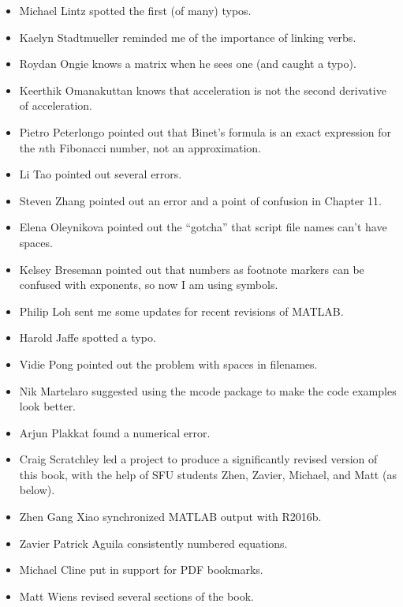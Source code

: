 \documentclass[
]{book}
\begin{document}
\begin{itemize}

\item Michael Lintz spotted the first (of many) typos.

\item Kaelyn Stadtmueller reminded me of the importance of linking
verbs.

\item Roydan Ongie knows a matrix when he sees one (and caught a typo).

\item Keerthik Omanakuttan knows that acceleration is not the
second derivative of acceleration.

\item Pietro Peterlongo pointed out that Binet's formula is an
exact expression for the $n$th Fibonacci number, not an approximation.

\item Li Tao pointed out several errors.

\item Steven Zhang pointed out an error and a point of confusion
in Chapter 11.

\item Elena Oleynikova pointed out the ``gotcha'' that script file names
can't have spaces.

\item Kelsey Breseman pointed out that numbers as footnote markers
can be confused with exponents, so now I am using symbols.

\item Philip Loh sent me some updates for recent revisions of MATLAB.

\item Harold Jaffe spotted a typo.

\item Vidie Pong pointed out the problem with spaces in filenames.

\item Nik Martelaro suggested using the mcode package to make the
code examples look better.

\item Arjun Plakkat found a numerical error.

\item Craig Scratchley led a project to produce a significantly
revised version of this book, with the help of SFU students Zhen, Zavier,
Michael, and Matt (as below).

\item Zhen Gang Xiao synchronized MATLAB output with R2016b.

\item Zavier Patrick Aguila consistently numbered equations.

\item Michael Cline put in support for PDF bookmarks.

\item Matt Wiens revised several sections of the book.

\end{itemize}
\end{document}
